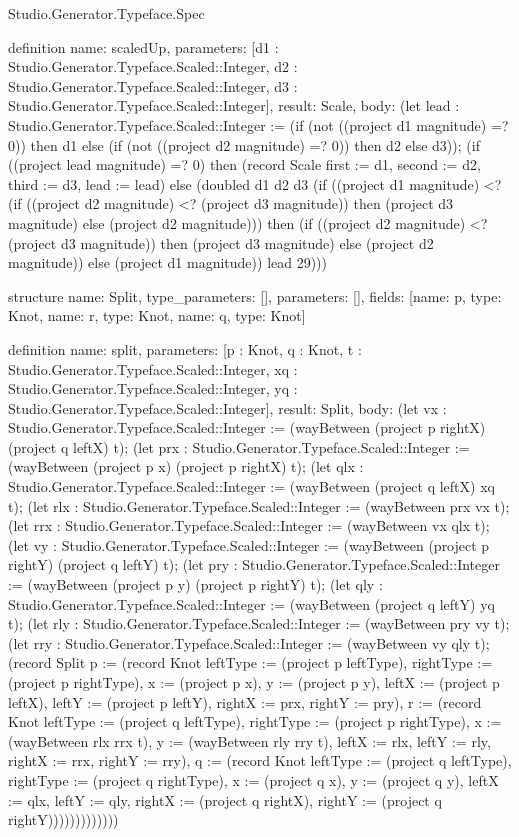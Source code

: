 \begin{lexlean}{Studio.Generator.Typeface.Spec}
\begin{semanticmodule}
definition{
  name: scaledUp,
  parameters: [d1 : Studio.Generator.Typeface.Scaled::Integer, d2 : Studio.Generator.Typeface.Scaled::Integer, d3 : Studio.Generator.Typeface.Scaled::Integer],
  result: Scale,
  body: (let lead : Studio.Generator.Typeface.Scaled::Integer := (if (not ((project d1 magnitude) =? 0)) then d1 else (if (not ((project d2 magnitude) =? 0)) then d2 else d3)); (if ((project lead magnitude) =? 0) then (record Scale {first := d1, second := d2, third := d3, lead := lead}) else (doubled d1 d2 d3 (if ((project d1 magnitude) <? (if ((project d2 magnitude) <? (project d3 magnitude)) then (project d3 magnitude) else (project d2 magnitude))) then (if ((project d2 magnitude) <? (project d3 magnitude)) then (project d3 magnitude) else (project d2 magnitude)) else (project d1 magnitude)) lead 29)))
}

structure{
  name: Split,
  type_parameters: [],
  parameters: [],
  fields: [{name: p, type: Knot}, {name: r, type: Knot}, {name: q, type: Knot}]
}

definition{
  name: split,
  parameters: [p : Knot, q : Knot, t : Studio.Generator.Typeface.Scaled::Integer, xq : Studio.Generator.Typeface.Scaled::Integer, yq : Studio.Generator.Typeface.Scaled::Integer],
  result: Split,
  body: (let vx : Studio.Generator.Typeface.Scaled::Integer := (wayBetween (project p rightX) (project q leftX) t); (let prx : Studio.Generator.Typeface.Scaled::Integer := (wayBetween (project p x) (project p rightX) t); (let qlx : Studio.Generator.Typeface.Scaled::Integer := (wayBetween (project q leftX) xq t); (let rlx : Studio.Generator.Typeface.Scaled::Integer := (wayBetween prx vx t); (let rrx : Studio.Generator.Typeface.Scaled::Integer := (wayBetween vx qlx t); (let vy : Studio.Generator.Typeface.Scaled::Integer := (wayBetween (project p rightY) (project q leftY) t); (let pry : Studio.Generator.Typeface.Scaled::Integer := (wayBetween (project p y) (project p rightY) t); (let qly : Studio.Generator.Typeface.Scaled::Integer := (wayBetween (project q leftY) yq t); (let rly : Studio.Generator.Typeface.Scaled::Integer := (wayBetween pry vy t); (let rry : Studio.Generator.Typeface.Scaled::Integer := (wayBetween vy qly t); (record Split {p := (record Knot {leftType := (project p leftType), rightType := (project p rightType), x := (project p x), y := (project p y), leftX := (project p leftX), leftY := (project p leftY), rightX := prx, rightY := pry}), r := (record Knot {leftType := (project q leftType), rightType := (project p rightType), x := (wayBetween rlx rrx t), y := (wayBetween rly rry t), leftX := rlx, leftY := rly, rightX := rrx, rightY := rry}), q := (record Knot {leftType := (project q leftType), rightType := (project q rightType), x := (project q x), y := (project q y), leftX := qlx, leftY := qly, rightX := (project q rightX), rightY := (project q rightY)})})))))))))))
}


\end{semanticmodule}
\end{lexlean}
